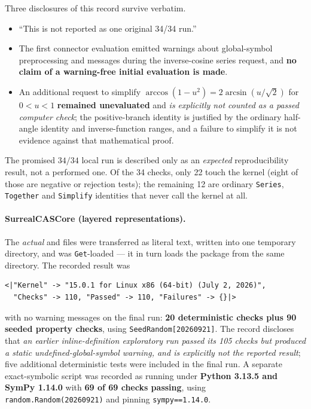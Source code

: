 \documentclass[11pt,letterpaper]{article}
\numberwithin{equation}{section}
\theoremstyle{definition}
\theoremstyle{remark}
\begin{document}
Three disclosures of this record survive verbatim.
\begin{itemize}
\item ``This is not reported as one original 34/34 run.''
\item The first connector evaluation emitted warnings about global-symbol
preprocessing and messages during the inverse-cosine series request, and
\textbf{no claim of a warning-free initial evaluation is made}.
\item An additional request to simplify $\arccos(1-u^2)=2\arcsin(u/\sqrt2)$ for
$0<u<1$ \textbf{remained unevaluated} and \emph{is explicitly not counted as a
passed computer check}; the positive-branch identity is justified by the
ordinary half-angle identity and inverse-function ranges, and a failure to
simplify it is not evidence against that mathematical proof.
\end{itemize}
The promised $34/34$ local run is described only as an \emph{expected}
reproducibility result, not a performed one. Of the 34 checks, only 22 touch the
kernel (eight of those are negative or rejection tests); the remaining 12 are
ordinary \texttt{Series}, \texttt{Together} and \texttt{Simplify} identities
that never call the kernel at all.

\paragraph{SurrealCASCore (layered representations).}
The \emph{actual}  and  files were
transferred as literal text, written into one temporary directory, and
 was \texttt{Get}-loaded --- it in turn loads the package
from the same directory. The recorded result was
\begin{lstlisting}
<|"Kernel" -> "15.0.1 for Linux x86 (64-bit) (July 2, 2026)",
  "Checks" -> 110, "Passed" -> 110, "Failures" -> {}|>
\end{lstlisting}
with no warning messages on the final run: \textbf{20 deterministic checks plus
90 seeded property checks}, using \texttt{SeedRandom[20260921]}. The record
discloses that \emph{an earlier inline-definition exploratory run passed its 105
checks but produced a static undefined-global-symbol warning, and is explicitly
not the reported result}; five additional deterministic tests were included in
the final run. A separate exact-symbolic script  was
recorded as running under \textbf{Python 3.13.5 and SymPy 1.14.0} with
\textbf{69 of 69 checks passing}, using \texttt{random.Random(20260921)} and
pinning \texttt{sympy==1.14.0}.
\end{document}
